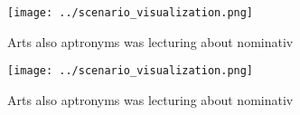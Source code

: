 \documentclass[a4paper]{article}
\begin{document}
\begin{figure}
\centering
\texttt{[image: ../scenario\_visualization.png]}
\caption{Arts also aptronyms was lecturing about nominativ
}
\end{figure}
 
\begin{figure}
\centering
\texttt{[image: ../scenario\_visualization.png]}
\caption{Arts also aptronyms was lecturing about nominativ
}
\end{figure}
 
\end{document}
